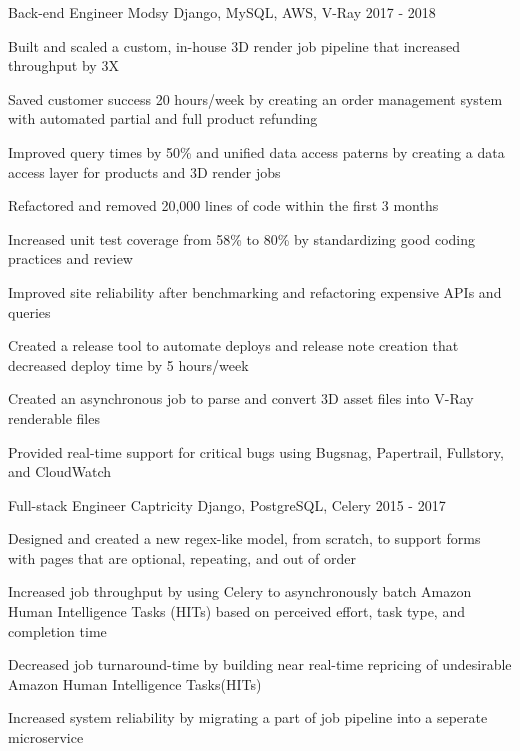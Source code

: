 \begin{cventries}
  \cventry
    {Back-end Engineer}
    {Modsy}
    {Django, MySQL, AWS, V-Ray}
    {2017 - 2018}
    {
      \begin{cvitems}
        \item {Built and scaled a custom, in-house 3D render job pipeline that increased throughput by 3X}
        \item {Saved customer success 20 hours/week by creating an order management system with automated partial and full product refunding}
        \item {Improved query times by 50\% and unified data access paterns by creating a data access layer for products and 3D render jobs}
        \item {Refactored and removed 20,000 lines of code within the first 3 months}
        \item {Increased unit test coverage from 58\% to 80\% by standardizing good coding practices and review}
        \item {Improved site reliability after benchmarking and refactoring expensive APIs and queries}
        \item {Created a release tool to automate deploys and release note creation that decreased deploy time by 5 hours/week}
        \item {Created an asynchronous job to parse and convert 3D asset files into V-Ray renderable files}
        \item {Provided real-time support for critical bugs using Bugsnag, Papertrail, Fullstory, and CloudWatch}
      \end{cvitems}
    }
  \cventry
    {Full-stack Engineer}
    {Captricity}
    {Django, PostgreSQL, Celery}
    {2015 - 2017}
    {
      \begin{cvitems}
        \item {Designed and created a new regex-like model, from scratch, to support forms with pages that are optional, repeating, and out of order}
        \item {Increased job throughput by using Celery to asynchronously batch Amazon Human Intelligence Tasks (HITs) based on perceived effort, task type, and completion time}
        \item {Decreased job turnaround-time by building near real-time repricing of undesirable Amazon Human Intelligence Tasks(HITs)}
        \item {Increased system reliability by migrating a part of job pipeline into a seperate microservice}

\end{cvitems}}
\end{cventries}
